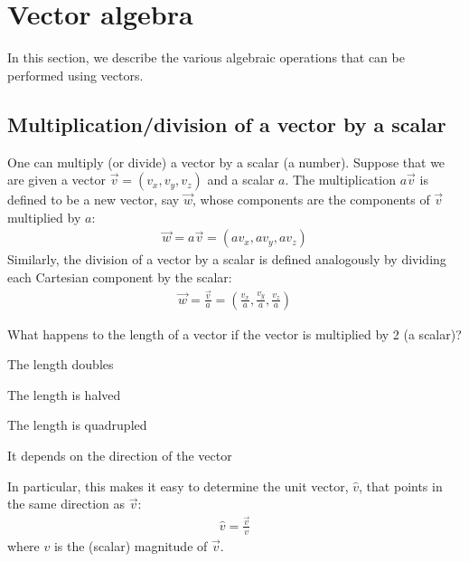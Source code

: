 

\section{Vector algebra}
In this section, we describe the various algebraic operations that can be performed using vectors. 
\subsection{Multiplication/division of a vector by a scalar}
One can multiply (or divide) a vector by a scalar (a number). Suppose that we are given a vector $\vec v=(v_x, v_y, v_z)$ and a scalar $a$. The multiplication $a\vec v$ is defined to be a new vector, say $\vec w$, whose components are the components of $\vec v$ multiplied by $a$:
\begin{align*}
\vec w = a\vec v = (av_x, a v_y, av_z)
\end{align*}
Similarly, the division of a vector by a scalar is defined analogously by dividing each Cartesian component by the scalar:
\begin{align*}
\vec w = \frac{\vec v}{a} = \left(\frac{v_x}{a}, \frac{v_y}{a}, \frac{v_z}{a}\right)
\end{align*}
\begin{checkpoint}
\begin{MCquestion}
{What happens to the length of a vector if the vector is multiplied by 2 (a scalar)?}
\item The length doubles \correct
\item The length is halved
\item The length is quadrupled
\item It depends on the direction of the vector
\end{MCquestion}
\end{checkpoint}

In particular, this makes it easy to determine the unit vector, $\hat v$, that points in the same direction as $\vec v$:
\begin{align*}
\hat v = \frac{\vec v}{v}
\end{align*}
where $v$ is the (scalar) magnitude of $\vec v$. 

